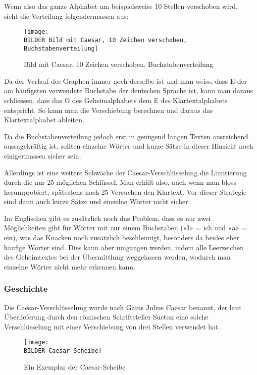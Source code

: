 Wenn also das ganze Alphabet um beispielsweise 10 Stellen verschoben wird, sieht die Verteilung folgendermassen aus:

\begin{figure}[h!]  %
	\centering
		\texttt{[image: \\BILDER Bild mit Caesar, 10 Zeichen verschoben, Buchstabenverteilung]}
 	\caption{Bild mit Caesar, 10 Zeichen verschoben, Buchstabenverteilung \cite{wikipedia:caesar_verschluesselung}}
  \label{fig:verteilung-buchstaben-caesar-10}
\end{figure}

Da der Verlauf des Graphen immer noch derselbe ist und man weiss, dass E der am häufigsten verwendete Buchstabe der deutschen Sprache ist, kann man daraus schliessen, dass das O des Geheimalphabets dem E des Klartextalphabets entspricht. So kann man die Verschiebung berechnen und daraus das Klartextalphabet ableiten.

Da die Buchstabenverteilung jedoch erst in genügend langen Texten ausreichend aussagekräftig ist, sollten einzelne Wörter und kurze Sätze in dieser Hinsicht noch einigermassen sicher sein.

Allerdings ist eine weitere Schwäche der Caesar-Verschlüsselung die Limitierung durch die nur 25 möglichen Schlüssel. Man erhält also, auch wenn man bloss herumprobiert, spätestens nach 25 Versuchen den Klartext. Vor dieser Strategie sind dann auch kurze Sätze und einzelne Wörter nicht sicher.

Im Englischen gibt es zusätzlich noch das Problem, dass es nur zwei Möglichkeiten gibt für Wörter mit nur einem Buchstaben («I» = ich und «a» = ein), was das Knacken noch zusätzlich beschleunigt, besonders da beides eher häufige Wörter sind. Dies kann aber umgangen werden, indem alle Leerzeichen des Geheimtextes bei der Übermittlung weggelassen werden, wodurch man einzelne Wörter nicht mehr erkennen kann.


\subsubsection{Geschichte}
\label{sec:c-geschichte}
Die Caesar-Verschlüsselung wurde nach Gaius Julius Caesar benannt, der laut Überlieferung durch den römischen Schriftsteller Sueton eine solche Verschlüsselung mit einer Verschiebung von drei Stellen verwendet hat.

\begin{figure}[h!]  %
	\centering
		\texttt{[image: \\BILDER Caesar-Scheibe]}
 	\caption{Ein Exemplar der Caesar-Scheibe \cite{de_spionagemuseum:chiffrierscheibe}}
  \label{fig:caesar-scheibe}
\end{figure}

